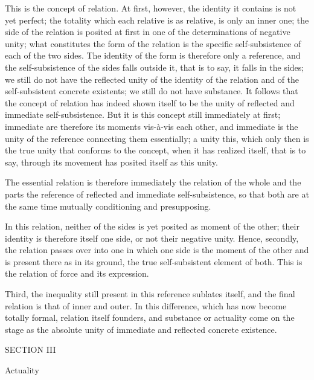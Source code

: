 This is the concept of relation.
At first, however, the identity it contains
is not yet perfect;
the totality which each relative is as relative,
is only an inner one;
the side of the relation is posited at first
in one of the determinations of negative unity;
what constitutes the form of the relation is
the specific self-subsistence of each of the two sides.
The identity of the form is therefore only a reference,
and the self-subsistence of the sides falls outside it,
that is to say, it falls in the sides;
we still do not have the reflected unity
of the identity of the relation
and of the self-subsistent concrete existents;
we still do not have substance.
It follows that the concept of relation has
indeed shown itself to be the unity
of reflected and immediate self-subsistence.
But it is this concept still immediately at first;
immediate are therefore its moments vis-à-vis each other,
and immediate is the unity of the reference
connecting them essentially;
a unity this, which only then is the true unity
that conforms to the concept,
when it has realized itself, that is to say,
through its movement has posited itself as this unity.

The essential relation is therefore immediately
the relation of the whole and the parts
the reference of reflected and immediate self-subsistence,
so that both are at the same time
mutually conditioning and presupposing.

In this relation, neither of the sides is
yet posited as moment of the other;
their identity is therefore itself one side,
or not their negative unity.
Hence, secondly, the relation passes over into one
in which one side is the moment of the other
and is present there as in its ground,
the true self-subsistent element of both.
This is the relation of force and its expression.

Third, the inequality still present
in this reference sublates itself,
and the final relation is that of inner and outer.
In this difference,
which has now become totally formal,
relation itself founders,
and substance or actuality come on the stage
as the absolute unity of
immediate and reflected concrete existence.

SECTION III

Actuality

